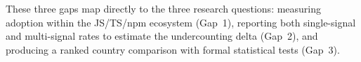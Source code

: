 These three gaps map directly to the three research questions: measuring adoption within the JS/TS/npm ecosystem (Gap~1), reporting both single-signal and multi-signal rates to estimate the undercounting delta (Gap~2), and producing a ranked country comparison with formal statistical tests (Gap~3).
